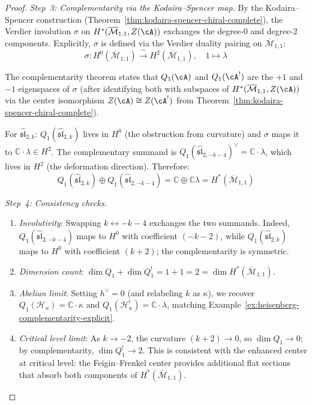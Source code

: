 \begin{proof}
\emph{Step~3: Complementarity via the Kodaira--Spencer map.}
By the Kodaira--Spencer construction (Theorem~\ref{thm:kodaira-spencer-chiral-complete}), the Verdier involution $\sigma$ on $H^*(\overline{\mathcal{M}}_{1,1}, Z(\cA))$ exchanges the degree-0 and degree-2 components.  Explicitly, $\sigma$ is defined via the Verdier duality pairing on $\overline{\mathcal{M}}_{1,1}$:
\begin{equation}
\sigma: H^0(\overline{\mathcal{M}}_{1,1}) \xrightarrow{\;\sim\;} H^2(\overline{\mathcal{M}}_{1,1}), \quad 1 \mapsto \lambda
\end{equation}

The complementarity theorem states that $Q_1(\cA)$ and $Q_1(\cA^!)$ are the $+1$ and $-1$ eigenspaces of $\sigma$ (after identifying both with subspaces of $H^*(\overline{\mathcal{M}}_{1,1}, Z(\cA))$ via the center isomorphism $Z(\cA) \cong Z(\cA^!)$ from Theorem~\ref{thm:kodaira-spencer-chiral-complete}).

For $\widehat{\mathfrak{sl}}_{2,k}$: $Q_1(\widehat{\mathfrak{sl}}_{2,k})$ lives in $H^0$ (the obstruction from curvature) and $\sigma$ maps it to $\mathbb{C} \cdot \lambda \in H^2$.  The complementary summand is $Q_1(\widehat{\mathfrak{sl}}_{2,-k-4})^\vee = \mathbb{C} \cdot \lambda$, which lives in $H^2$ (the deformation direction).  Therefore:
\begin{equation}
Q_1(\widehat{\mathfrak{sl}}_{2,k}) \oplus Q_1(\widehat{\mathfrak{sl}}_{2,-k-4}) = \mathbb{C} \oplus \mathbb{C}\lambda = H^*(\overline{\mathcal{M}}_{1,1})
\end{equation}

\emph{Step~4: Consistency checks.}
\begin{enumerate}
\item \emph{Involutivity}: Swapping $k \leftrightarrow -k-4$ exchanges the two summands.  Indeed, $Q_1(\widehat{\mathfrak{sl}}_{2,-k-4})$ maps to $H^0$ with coefficient $(-k-2)$, while $Q_1(\widehat{\mathfrak{sl}}_{2,k})$ maps to $H^0$ with coefficient $(k+2)$; the complementarity is symmetric.
\item \emph{Dimension count}: $\dim Q_1 + \dim Q_1^! = 1 + 1 = 2 = \dim H^*(\overline{\mathcal{M}}_{1,1})$. \checkmark
\item \emph{Abelian limit}: Setting $h^\vee = 0$ (and relabeling $k$ as $\kappa$), we recover $Q_1(\mathcal{H}_\kappa) = \mathbb{C} \cdot \kappa$ and $Q_1(\mathcal{H}_\kappa^!) = \mathbb{C} \cdot \lambda$, matching Example~\ref{ex:heisenberg-complementarity-explicit}. \checkmark
\item \emph{Critical level limit}: As $k \to -2$, the curvature $(k+2) \to 0$, so $\dim Q_1 \to 0$; by complementarity, $\dim Q_1^! \to 2$.  This is consistent with the enhanced center at critical level: the Feigin--Frenkel center provides additional flat sections that absorb both components of $H^*(\overline{\mathcal{M}}_{1,1})$. \checkmark
\end{enumerate}
\end{proof}

